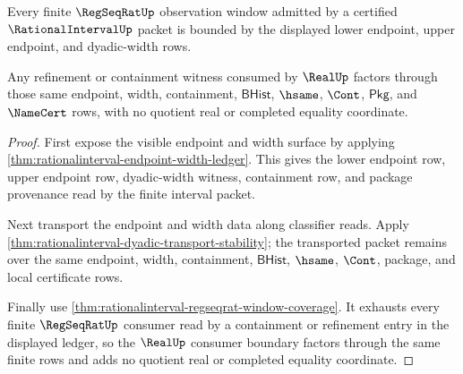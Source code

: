 \begin{theorem}
\label{thm:rationalinterval-regular-window-dyadic-endpoints}
Every finite $\RegSeqRatUp$ observation window admitted by a certified
$\RationalIntervalUp$ packet is bounded by the displayed lower endpoint, upper
endpoint, and dyadic-width rows.

Any refinement or containment witness consumed by $\RealUp$ factors through
those same endpoint, width, containment, $\mathsf{BHist}$, $\hsame$, $\Cont$,
$\mathsf{Pkg}$, and $\NameCert$ rows, with no quotient real or completed
equality coordinate.
\end{theorem}
\begin{proof}
First expose the visible endpoint and width surface by applying
\autoref{thm:rationalinterval-endpoint-width-ledger}. This gives the lower
endpoint row, upper endpoint row, dyadic-width witness, containment row, and
package provenance read by the finite interval packet.

Next transport the endpoint and width data along classifier reads. Apply
\autoref{thm:rationalinterval-dyadic-transport-stability}; the transported
packet remains over the same endpoint, width, containment, $\mathsf{BHist}$,
$\hsame$, $\Cont$, package, and local certificate rows.

Finally use \autoref{thm:rationalinterval-regseqrat-window-coverage}. It
exhausts every finite $\RegSeqRatUp$ consumer read by a containment or
refinement entry in the displayed ledger, so the $\RealUp$ consumer boundary
factors through the same finite rows and adds no quotient real or completed
equality coordinate.
\end{proof}

